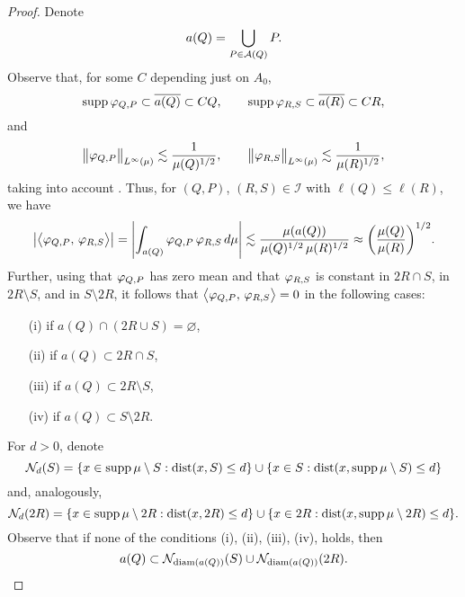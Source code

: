 \begin{proof}
Denote 
$$a(Q)=\bigcup_{P\in{\mathcal A}(Q)} P.$$
Observe that, for some $C$ depending just on $A_0$,
$$\operatorname{supp}{\varphi}_{Q,P}\subset \overline{a(Q)}\subset CQ,\qquad \operatorname{supp}{\varphi}_{R,S}\subset \overline{a(R)}\subset CR,$$
and
$$\big\|{\varphi}_{Q,P}\big\|_{L^\infty(\mu)}\lesssim \frac1{\mu(Q)^{1/2}},\qquad \big\|{\varphi}_{R,S}\big\|_{L^\infty(\mu)}\lesssim \frac1{\mu(R)^{1/2}},$$
 taking into account .
Thus, for $(Q,P)$, $(R,S)\in\mathcal{I}$ with $\ell(Q)\leq\ell(R)$, we have
$$\big|\big\langle{\varphi}_{Q,P},\, {\varphi}_{R,S}\big\rangle \big| = \left|\int_{a(Q)} {\varphi}_{Q,P}\, {\varphi}_{R,S}\,d\mu\right|
\lesssim \frac{\mu(a(Q))}{\mu(Q)^{1/2}\,\mu(R)^{1/2}}
 \approx \bigg(\frac{\mu(Q)}{\mu(R)}\bigg)^{1/2}.$$
Further, using that ${\varphi}_{Q,P}$ has zero mean and that ${\varphi}_{R,S}$ is constant in $2R\cap S$, in $2R\setminus S$, 
and in $S\setminus 2R$,
it follows that $\big\langle{\varphi}_{Q,P},\, {\varphi}_{R,S}\big\rangle =0$ in the following cases:
\begin{itemize}
\item[(i)] if $a(Q)\cap (2R\cup S) = \varnothing$,
\item[(ii)] if $a(Q)\subset 2R\cap S$,
\item[(iii)] if $a(Q)\subset 2R\setminus S$,
\item[(iv)] if $a(Q)\subset S\setminus 2R$.
\end{itemize}
For $d>0$, denote
$$\mathcal N_d(S) = \{x\in\operatorname{supp}\mu\setminus S:{\rm dist}(x,S)\leq d\}
\cup \{x\in S:{\rm dist}(x,\operatorname{supp}\mu\setminus S)\leq d\}$$
and, analogously,
$$\mathcal N_d(2R) = \{x\in\operatorname{supp}\mu\setminus 2R:{\rm dist}(x,2R)\leq d\}
\cup \{x\in 2R:{\rm dist}(x,\operatorname{supp}\mu\setminus 2R)\leq d\}.$$
Observe that if none of the conditions (i), (ii), (iii), (iv), holds, then
\begin{equation}\label{eqdd22}
a(Q)\subset \mathcal N_{{\rm diam}(a(Q))}(S) \cup \mathcal N_{{\rm diam}(a(Q))}(2R).
\end{equation}


\end{proof}
